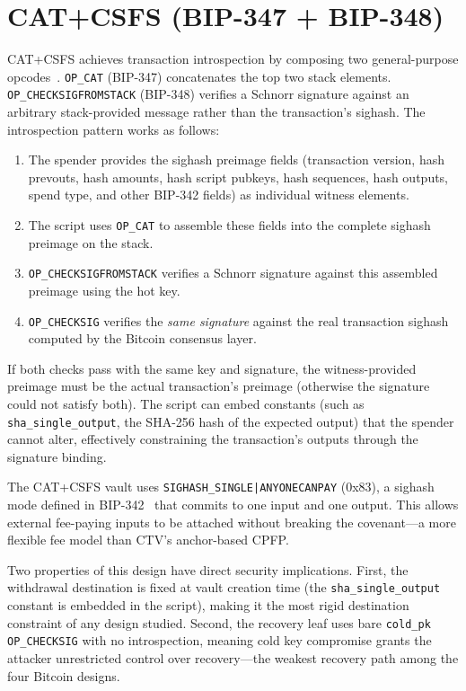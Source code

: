 \section{CAT+CSFS (BIP-347 + BIP-348)} \label{se:catcsfs_bg}

CAT+CSFS achieves transaction introspection by composing two general-purpose
opcodes~\cite{Poe21, BIP347, BIP348}. \texttt{OP\_CAT} (BIP-347) concatenates the top
two stack elements. \texttt{OP\_CHECKSIGFROMSTACK} (BIP-348) verifies a Schnorr
signature against an arbitrary stack-provided message rather than the transaction's
sighash. The introspection pattern works as follows:

\begin{enumerate}
\item The spender provides the sighash preimage fields (transaction version, hash
  prevouts, hash amounts, hash script pubkeys, hash sequences, hash outputs, spend
  type, and other BIP-342 fields) as individual witness elements.
\item The script uses \texttt{OP\_CAT} to assemble these fields into the complete
  sighash preimage on the stack.
\item \texttt{OP\_CHECKSIGFROMSTACK} verifies a Schnorr signature against this
  assembled preimage using the hot key.
\item \texttt{OP\_CHECKSIG} verifies the \emph{same signature} against the real
  transaction sighash computed by the Bitcoin consensus layer.
\end{enumerate}

If both checks pass with the same key and signature, the witness-provided preimage
must be the actual transaction's preimage (otherwise the signature could not satisfy
both). The script can embed constants (such as \texttt{sha\_single\_output}, the SHA-256
hash of the expected output) that the spender cannot alter, effectively constraining
the transaction's outputs through the signature binding.

The CAT+CSFS vault uses \texttt{SIGHASH\_SINGLE|ANYONECANPAY} (0x83), a sighash
mode defined in BIP-342~\cite{BIP342} that commits to one input and one output.
This allows external fee-paying inputs to be attached without breaking the
covenant---a more flexible fee model than CTV's anchor-based CPFP.

Two properties of this design have direct security implications. First, the withdrawal
destination is fixed at vault creation time (the \texttt{sha\_single\_output} constant
is embedded in the script), making it the most rigid destination constraint of any
design studied. Second, the recovery leaf uses bare \texttt{cold\_pk OP\_CHECKSIG}
with no introspection, meaning cold key compromise grants the attacker unrestricted
control over recovery---the weakest recovery path among the four Bitcoin designs.

